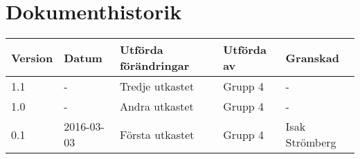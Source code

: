 \documentclass[11pt]{article}
\begin{document}
\tableofcontents

\pagebreak
\section*{Dokumenthistorik}
\begin{table}[h]
\begin{tabular}{|l|l|l|l|l|} \hline

\textbf{Version} & \textbf{Datum} & \textbf{Utförda förändringar} & \textbf{Utförda av} & \textbf{Granskad} \\ \hline
1.1 & - & Tredje utkastet & Grupp 4 & - \\ \hline
1.0 & - & Andra utkastet & Grupp 4 & - \\ \hline
0.1 & 2016-03-03 &  Första utkastet & Grupp 4 & Isak Strömberg \\ \hline
\end{tabular}
\end{table}

\pagebreak
{}
\end{document}
